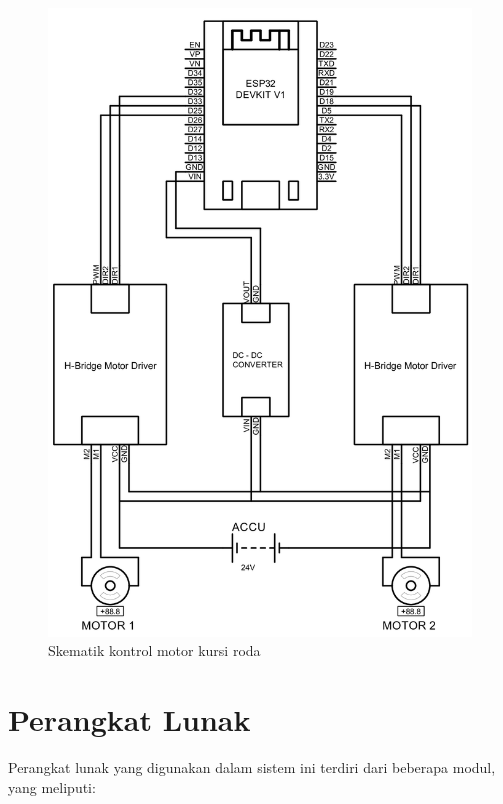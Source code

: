 \begin{figure}[H]
  \centering

  \includegraphics[scale=0.3]{gambar/Schematics.png}

  \caption{Skematik kontrol motor kursi roda}
  \label{fig:Skematik Kontrol motor Kursi roda.}
\end{figure}

\section{Perangkat Lunak}
\label{sec:perangkatlunak}

Perangkat lunak yang digunakan dalam sistem ini terdiri dari beberapa modul, yang meliputi:

